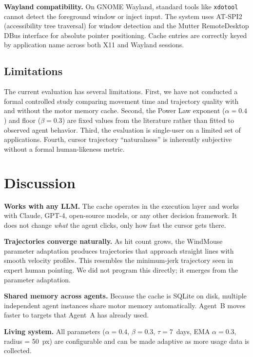 \documentclass[conference]{IEEEtran}
\begin{document}
\textbf{Wayland compatibility.} On GNOME Wayland, standard tools like \texttt{xdotool} cannot detect the foreground window or inject input. The system uses AT-SPI2 (accessibility tree traversal) for window detection and the Mutter RemoteDesktop DBus interface for absolute pointer positioning. Cache entries are correctly keyed by application name across both X11 and Wayland sessions.

\subsection{Limitations}

The current evaluation has several limitations. First, we have not conducted a formal controlled study comparing movement time and trajectory quality with and without the motor memory cache. Second, the Power Law exponent ($\alpha = 0.4$) and floor ($\beta = 0.3$) are fixed values from the literature rather than fitted to observed agent behavior. Third, the evaluation is single-user on a limited set of applications. Fourth, cursor trajectory ``naturalness'' is inherently subjective without a formal human-likeness metric.

\section{Discussion}

\textbf{Works with any LLM.} The cache operates in the execution layer and works with Claude, GPT-4, open-source models, or any other decision framework. It does not change \emph{what} the agent clicks, only how fast the cursor gets there.

\textbf{Trajectories converge naturally.} As hit count grows, the WindMouse parameter adaptation produces trajectories that approach straight lines with smooth velocity profiles. This resembles the minimum-jerk trajectory seen in expert human pointing. We did not program this directly; it emerges from the parameter adaptation.

\textbf{Shared memory across agents.} Because the cache is SQLite on disk, multiple independent agent instances share motor memory automatically. Agent~B moves faster to targets that Agent~A has already used.

\textbf{Living system.} All parameters ($\alpha = 0.4$, $\beta = 0.3$, $\tau = 7$~days, EMA $\alpha = 0.3$, radius = 50~px) are configurable and can be made adaptive as more usage data is collected.
\end{document}
